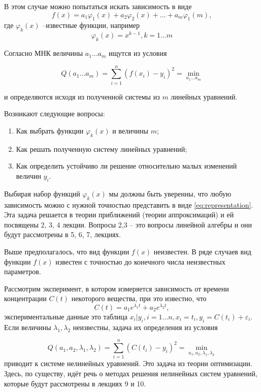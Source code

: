 В этом случае можно попытаться искать зависимость в виде 
\begin{equation} \label{eq:representation}
	f(x) = a_1 \varphi _1(x) + a_2 \varphi _2(x) + \dots + a_m \varphi _1(m),
\end{equation}
где $\varphi _k(x)$ --известные функции, например
\begin{equation}
	\varphi _k(x) = x^{k-1},  k = 1 \dots m
\end{equation}

Согласно МНК величины $a_1 \dots a_m$ ищутся из условия

 \begin{equation}
	Q(a_1 \dots a_m) = \sum^n_{i=1}{(f(x_i) -y_i)^2} = \min_{a_1 \dots a_m}
\end{equation}

и определяются исходя из полученной системы из $m$ линейных уравнений.

Возникают следующие вопросы:
\begin{enumerate}
	\item Как выбрать функции $\varphi _k(x)$ и величины $m$;
	\item Как решать полученную систему линейных уравнений;
	\item Как определить устойчиво ли решение относительно малых изменений величин $y_i$.
\end{enumerate}


Выбирая набор функций $\varphi _k(x)$ мы должны быть уверенны, что любую зависимость можно с нужной точностью представить в виде \ref{eq:representation}. Эта задача решается в теории приближений (теории аппроксимаций) и ей посвящены 2, 3, 4 лекции. Вопросы 2,3 -- это вопросы линейной алгебры и они будут рассмотрены в 5, 6, 7, лекциях.

Выше предполагалось, что вид функции $f(x)$ неизвестен. В ряде случаев вид функции  $f(x)$ известен с точностью до конечного числа неизвестных параметров.

Рассмотрим эксперимент, в котором измеряется зависимость от времени концентрации $C(t)$ некоторого вещества, при это известно, что 
\begin{equation}
	C(t) = a_1e^{\lambda_1 t} + a_2 e^{\lambda_2 t},
\end{equation}
экспериментальные данные это таблица $x_i | y_i, i=1\dots n, x_i = t_i, y_i = C(t_i) + \varepsilon_i$. Если величины $\lambda_1, \lambda_2$ неизвестны, задача их определения из условия

 \begin{equation}
	Q(a_1,a_2,\lambda_1, \lambda_2) = \sum^n_{i=1}{(C(t_i) -y_i)^2} = \min_{a_1,a_2,\lambda_1, \lambda_2}
\end{equation}
приводит к системе нелинейных уравнений. Это задача из теории оптимизации. Здесь, по существу, идёт речь о методах решения нелинейных систем уравнений, которые будут рассмотрены в лекциях 9 и 10.

